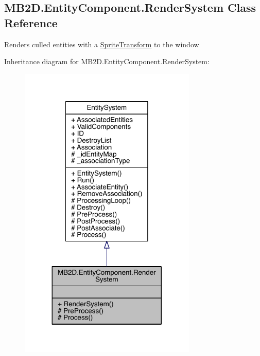 \hypertarget{class_m_b2_d_1_1_entity_component_1_1_render_system}{}\subsection{M\+B2\+D.\+Entity\+Component.\+Render\+System Class Reference}
\label{class_m_b2_d_1_1_entity_component_1_1_render_system}


Renders culled entities with a \hyperlink{class_m_b2_d_1_1_entity_component_1_1_sprite_transform}{Sprite\+Transform} to the window  




Inheritance diagram for M\+B2\+D.\+Entity\+Component.\+Render\+System\+:
\nopagebreak
\begin{figure}[H]
\begin{center}
\leavevmode
\includegraphics[width=239pt]{class_m_b2_d_1_1_entity_component_1_1_render_system__inherit__graph}
\end{center}
\end{figure}


